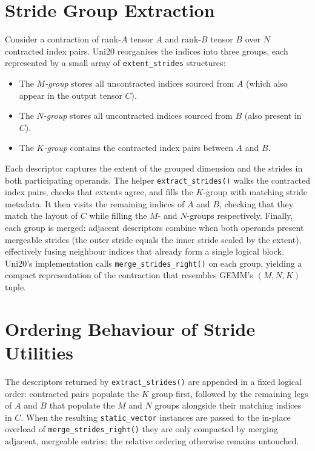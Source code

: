 \documentclass[11pt]{article}
\begin{document}
\section{Stride Group Extraction}
Consider a contraction of rank-$A$ tensor $A$ and rank-$B$ tensor $B$ over $N$ contracted index
pairs.  Uni20 reorganises the indices into three groups, each represented by a small array of
\texttt{extent\_strides} structures:
\begin{itemize}
  \item The \emph{$M$-group} stores all uncontracted indices sourced from $A$ (which also appear in
        the output tensor $C$).
  \item The \emph{$N$-group} stores all uncontracted indices sourced from $B$ (also present in $C$).
  \item The \emph{$K$-group} contains the contracted index pairs between $A$ and $B$.
\end{itemize}
Each descriptor captures the extent of the grouped dimension and the strides in both participating
operands.  The helper \texttt{extract\_strides()} walks the contracted index pairs, checks that
extents agree, and fills the $K$-group with matching stride metadata.  It then visits the remaining
indices of $A$ and $B$, checking that they match the layout of $C$ while filling the $M$- and
$N$-groups respectively.  Finally, each group is merged: adjacent descriptors combine when both
operands present mergeable strides (the outer stride equals the inner stride scaled by the extent),
effectively fusing neighbour indices that already form a single logical block.  Uni20's implementation
calls \texttt{merge\_strides\_right()} on each group, yielding a compact representation of the
contraction that resembles GEMM's $(M,N,K)$ tuple.

\section{Ordering Behaviour of Stride Utilities}\label{sec:merge-order}
The descriptors returned by \texttt{extract\_strides()} are appended in a fixed logical order:
contracted pairs populate the $K$ group first, followed by the remaining legs of $A$ and $B$ that
populate the $M$ and $N$ groups alongside their matching indices in $C$.  When the resulting
\texttt{static\_vector} instances are passed to the in-place overload of
\texttt{merge\_strides\_right()} they are only compacted by merging adjacent, mergeable entries;
the relative ordering otherwise remains untouched.
\end{document}
